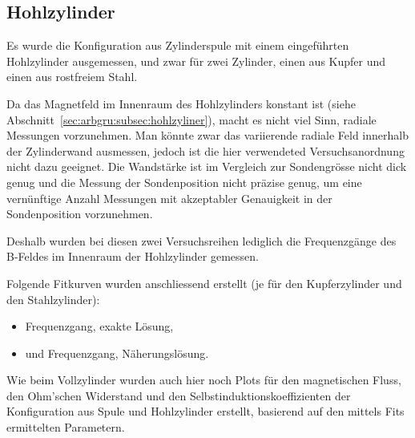 \clearpage
\subsection{Hohlzylinder}
\label{sec:ausw:subsec:hohlz}


Es  wurde  die  Konfiguration   aus  Zylinderspule  mit  einem  eingef\"uhrten
Hohlzylinder ausgemessen, und  zwar f\"ur zwei Zylinder, einen  aus Kupfer und
einen aus rostfreiem Stahl.

Da  das  Magnetfeld  im  Innenraum   des  Hohlzylinders  konstant  ist  (siehe
Abschnitt~\ref{sec:arbgru:subsec:hohlzyliner}),  macht  es  nicht  viel  Sinn,
radiale  Messungen  vorzunehmen. Man  k\"onnte zwar  das  variierende  radiale
Feld innerhalb  der Zylinderwand  ausmessen, jedoch  ist die  hier verwendeted
Versuchsanordnung nicht  dazu geeignet. Die Wandst\"arke ist  im Vergleich zur
Sondengr\"osse  nicht dick  genug  und die  Messung  der Sondenposition  nicht
pr\"azise  genug,  um  eine  vern\"unftige Anzahl  Messungen  mit  akzeptabler
Genauigkeit in der Sondenposition vorzunehmen.

Deshalb wurden  bei diesen  zwei Versuchsreihen lediglich  die Frequenzg\"ange
des B-Feldes im Innenraum der Hohlzylinder gemessen.

Folgende Fitkurven wurden anschliessend  erstellt (je f\"ur den Kupferzylinder
und den Stahlzylinder):
\begin{itemize}
    \item
        Frequenzgang, exakte L\"osung,
    \item
        und Frequenzgang, N\"aherungsl\"osung.
\end{itemize}

Wie  beim Vollzylinder  wurden auch  hier  noch Plots  f\"ur den  magnetischen
Fluss,  den Ohm'schen  Widerstand  und  den Selbstinduktionskoeffizienten  der
Konfiguration aus Spule  und Hohlzylinder erstellt, basierend  auf den mittels
Fits ermittelten Parametern.


